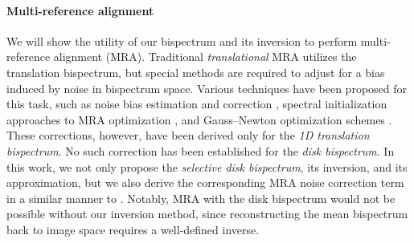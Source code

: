 \paragraph{Multi-reference alignment} We will show the utility of our bispectrum and its inversion to perform multi-reference alignment (MRA). Traditional \textit{translational} MRA utilizes the translation bispectrum, but special methods are required to adjust for a bias induced by noise in bispectrum space. Various techniques have been proposed for this task, such as noise bias estimation and correction \cite{bendory2018bispectrum}, spectral initialization approaches to MRA optimization \cite{chen2018spectral}, and Gauss–Newton optimization schemes \cite{herring2019gauss}. These corrections, however, have been derived only for the \textit{1D translation bispectrum}. No such correction has been established for the \textit{disk bispectrum}. In this work, we not only propose the \textit{selective disk bispectrum}, its inversion, and its approximation, but we also derive the corresponding MRA noise correction term in a similar manner to \cite{bendory2018bispectrum}. Notably, MRA with the disk bispectrum would not be possible without our inversion method, since reconstructing the mean bispectrum back to image space requires a well-defined inverse.
